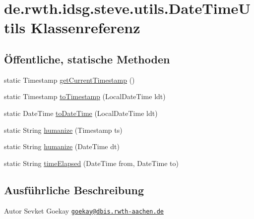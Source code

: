 \hypertarget{classde_1_1rwth_1_1idsg_1_1steve_1_1utils_1_1_date_time_utils}{\section{de.\-rwth.\-idsg.\-steve.\-utils.\-Date\-Time\-Utils Klassenreferenz}
\label{classde_1_1rwth_1_1idsg_1_1steve_1_1utils_1_1_date_time_utils}
}
\subsection*{Öffentliche, statische Methoden}
\begin{DoxyCompactItemize}
\item 
static Timestamp \hyperlink{classde_1_1rwth_1_1idsg_1_1steve_1_1utils_1_1_date_time_utils_a08d556da52d9f3c9fc91102fed2fbf67}{get\-Current\-Timestamp} ()
\item 
static Timestamp \hyperlink{classde_1_1rwth_1_1idsg_1_1steve_1_1utils_1_1_date_time_utils_a62d2cf0df91d4a0c4275aaff6627da1f}{to\-Timestamp} (Local\-Date\-Time ldt)
\item 
static Date\-Time \hyperlink{classde_1_1rwth_1_1idsg_1_1steve_1_1utils_1_1_date_time_utils_a1fcc4124cab4f66dfbc12de2dad0e5f6}{to\-Date\-Time} (Local\-Date\-Time ldt)
\item 
static String \hyperlink{classde_1_1rwth_1_1idsg_1_1steve_1_1utils_1_1_date_time_utils_a5d545569becc848199498a1a0a5d862a}{humanize} (Timestamp ts)
\item 
static String \hyperlink{classde_1_1rwth_1_1idsg_1_1steve_1_1utils_1_1_date_time_utils_a3abe47bae19ad6ebca3e0b888b87d21d}{humanize} (Date\-Time dt)
\item 
static String \hyperlink{classde_1_1rwth_1_1idsg_1_1steve_1_1utils_1_1_date_time_utils_a152ce39e95f7d08eaebb689771155cc6}{time\-Elapsed} (Date\-Time from, Date\-Time to)
\end{DoxyCompactItemize}


\subsection{Ausführliche Beschreibung}
\begin{DoxyAuthor}{Autor}
Sevket Goekay \href{mailto:goekay@dbis.rwth-aachen.de}{\tt goekay@dbis.\-rwth-\/aachen.\-de} 
\end{DoxyAuthor}


